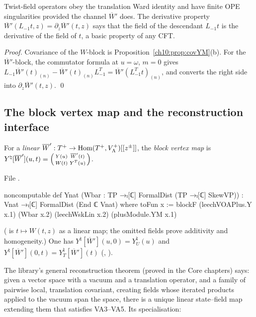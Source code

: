 \begin{physics}
Twist-field operators obey the translation Ward identity and have finite OPE singularities provided the channel $\overline W'$ does. The derivative property $\overline W'(L_{-1}t,z)=\partial_z\overline W'(t,z)$ says that the field of the descendant $L_{-1}t$ is the derivative of the field of $t$, a basic property of any CFT.
\end{physics}

\emph{Proof.}  Covariance of the $W$-block is Proposition~\ref{ch10:prop:covYM}(b).  For the
$\overline W'$-block, the commutator formula at $u=\omega$, $m=0$ gives
$L_{-1}\overline W'(t)_{(n)}-\overline W'(t)_{(n)}L^T_{-1}=\overline W'(L_{-1}^Tt)_{(n)}$, and
 converts the right side into $\partial_z\overline W'(t,z)$. \qed

\subsection{The block vertex map and the reconstruction interface}

\begin{definition}\label{ch10:def:Ynat}
For a \emph{linear} $\overline W':T^{+}\to\operatorname{Hom}(T^{+},V_{\Lambda}^{+})[[z^\pm]]$, the
\emph{block vertex map} is
$Y^\natural[\overline W'](u,t)=\begin{psmallmatrix}Y(u)&\overline W'(t)\\W(t)&Y^T(u)\end{psmallmatrix}$.
\end{definition}
\noindent File .
\begin{leancode}
noncomputable def Ynat (Wbar : TP →ₗ[ℂ] FormalDist (TP →ₗ[ℂ] SkewVP)) :
    Vnat →ₗ[ℂ] FormalDist (End ℂ Vnat) where
  toFun x := blockF (leechVOAPlus.Y x.1) (Wbar x.2) (leechWskLin x.2) (plusModule.YM x.1)
\end{leancode}
( is $t\mapsto W(t,z)$ as a linear map; the omitted fields prove additivity and
homogeneity.)  One has $Y^\natural[\overline W'](u,0)=Y^\natural_U(u)$ and
$Y^\natural[\overline W'](0,t)=Y^\natural_T[\overline W'](t)$ (, ).

The library's general reconstruction theorem (proved in the Core chapters) says: given a vector
space with a vacuum and a translation operator, and a family of pairwise local, translation
covariant, creating fields whose iterated products applied to the vacuum span the space, there
is a unique linear state--field map extending them that satisfies VA3--VA5.  Its specialisation:

